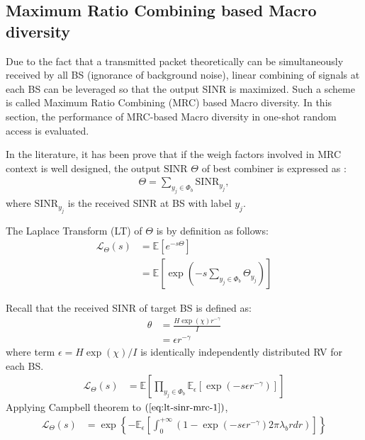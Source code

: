 \subsection{Maximum Ratio Combining based Macro diversity}
Due to the fact that a transmitted packet theoretically can be simultaneously received by all BS (ignorance of background noise), linear combining of signals at each BS can be leveraged so that the output SINR is maximized. Such a scheme is called Maximum Ratio Combining (MRC) based Macro diversity. In this section, the performance of MRC-based Macro diversity in one-shot random access is evaluated.

In the literature, it has been prove that if the weigh factors involved in MRC context is well designed, the output $\text{SINR}$ $\Theta$ of best combiner is expressed as :
\begin{align}
	\Theta = \sum_{y_j \in \Phi_{b}}^{} \text{SINR}_{y_j},
\end{align}
where $\text{SINR}_{y_j}$ is the received SINR at BS with label $y_j$.

The Laplace Transform (LT) of $\Theta$ is by definition as follows:
\begin{align}
	\label{eq:lt-sinr-mrc-1}
	\mathcal{L}_{\Theta}\left( s \right) &= \mathbb{E}\left[ e^{-s\Theta}\right] \nonumber\\
	&=\mathbb{E}\left[ \exp( -s \sum_{y_j \in \Phi_{b}}^{} \Theta_{y_j} )\right]
\end{align}

Recall that the received SINR of target BS is defined as:
\begin{align}
	\theta &= \frac{H \exp(\chi) r^{-\gamma}}{I} \nonumber\\
	&= \epsilon r^{-\gamma}
\end{align}
where term $\epsilon = H\exp(\chi)  / I$ is identically independently distributed RV for each BS.
\begin{align}
	\label{eq:lt-sinr-mrc-2}
	\mathcal{L}_{\Theta}\left( s \right) &= \mathbb{E}\left[ \prod_{y_j \in \Phi_b}^{} \mathbb{E}_{\epsilon} \left[ \exp( -s \epsilon r^{-\gamma}) \right] \right] 
\end{align}
Applying Campbell theorem to $(\ref{eq:lt-sinr-mrc-1})$,
\begin{align}
	\mathcal{L}_{\Theta}\left( s \right) &= \exp \left\lbrace -\mathbb{E}_{\epsilon}\left[ \int_{0}^{+\infty} \left(1-\exp(-s\epsilon r^{-\gamma} )2 \pi \lambda_{b} r dr\right)  \right]   \right\rbrace 
\end{align}

